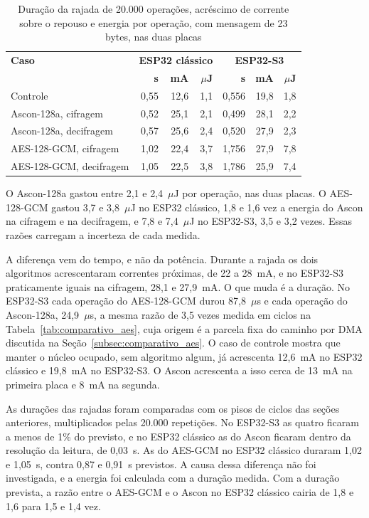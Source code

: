 \begin{table}[htb]
\centering
\caption{Duração da rajada de 20.000 operações, acréscimo de corrente sobre o repouso e energia por operação, com mensagem de 23 bytes, nas duas placas}
\label{tab:energia_ascon128a}
\begin{tabular}{lrrrrrr}
\hline
\textbf{Caso} & \multicolumn{3}{c}{\textbf{ESP32 clássico}} & \multicolumn{3}{c}{\textbf{ESP32-S3}} \\
 & \textbf{s} & \textbf{mA} & \textbf{$\mu$J} & \textbf{s} & \textbf{mA} & \textbf{$\mu$J} \\
\hline
Controle                 & 0,55 & 12,6 & 1,1 & 0,556 & 19,8 & 1,8 \\
Ascon-128a, cifragem     & 0,52 & 25,1 & 2,1 & 0,499 & 28,1 & 2,2 \\
Ascon-128a, decifragem   & 0,57 & 25,6 & 2,4 & 0,520 & 27,9 & 2,3 \\
AES-128-GCM, cifragem    & 1,02 & 22,4 & 3,7 & 1,756 & 27,9 & 7,8 \\
AES-128-GCM, decifragem  & 1,05 & 22,5 & 3,8 & 1,786 & 25,9 & 7,4 \\
\hline
\end{tabular}
\end{table}

O Ascon-128a gastou entre 2,1 e 2,4~$\mu$J por operação, nas duas placas. O AES-128-GCM gastou 3,7 e 3,8~$\mu$J no ESP32 clássico, 1,8 e 1,6 vez a energia do Ascon na cifragem e na decifragem, e 7,8 e 7,4~$\mu$J no ESP32-S3, 3,5 e 3,2 vezes. Essas razões carregam a incerteza de cada medida.

A diferença vem do tempo, e não da potência. Durante a rajada os dois algoritmos acrescentaram correntes próximas, de 22 a 28~mA, e no ESP32-S3 praticamente iguais na cifragem, 28,1 e 27,9~mA. O que muda é a duração. No ESP32-S3 cada operação do AES-128-GCM durou 87,8~$\mu$s e cada operação do Ascon-128a, 24,9~$\mu$s, a mesma razão de 3,5 vezes medida em ciclos na Tabela~\ref{tab:comparativo_aes}, cuja origem é a parcela fixa do caminho por DMA discutida na Seção~\ref{subsec:comparativo_aes}. O caso de controle mostra que manter o núcleo ocupado, sem algoritmo algum, já acrescenta 12,6~mA no ESP32 clássico e 19,8~mA no ESP32-S3. O Ascon acrescenta a isso cerca de 13~mA na primeira placa e 8~mA na segunda.

As durações das rajadas foram comparadas com os pisos de ciclos das seções anteriores, multiplicados pelas 20.000 repetições. No ESP32-S3 as quatro ficaram a menos de 1\% do previsto, e no ESP32 clássico as do Ascon ficaram dentro da resolução da leitura, de 0,03~s. As do AES-GCM no ESP32 clássico duraram 1,02 e 1,05~s, contra 0,87 e 0,91~s previstos. A causa dessa diferença não foi investigada, e a energia foi calculada com a duração medida. Com a duração prevista, a razão entre o AES-GCM e o Ascon no ESP32 clássico cairia de 1,8 e 1,6 para 1,5 e 1,4 vez.

